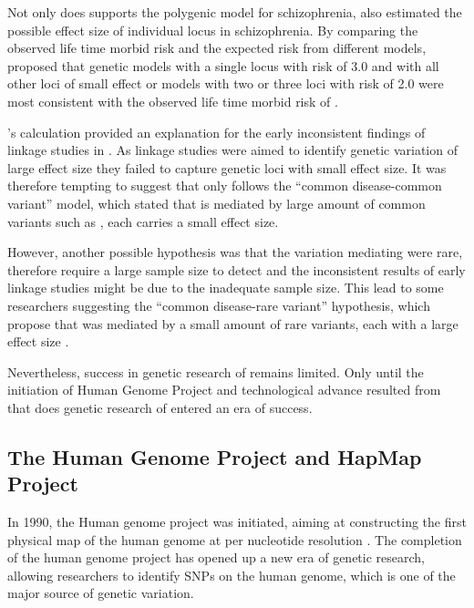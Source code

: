 	Not only does \citet{Risch1990a} supports the polygenic model for schizophrenia, \citet{Risch1990a} also estimated the possible effect size of individual locus in schizophrenia. 
	By comparing the observed life time morbid risk and the expected risk from different models, \citet{Risch1990a} proposed that genetic models with a single locus with risk of 3.0 and with all other loci of small effect or models with two or three loci with risk of 2.0 were most consistent with the observed life time morbid risk of  \citep{Risch1990}.
	
	\citet{Risch1990a}'s calculation provided an explanation for the early inconsistent findings of linkage studies in  \citep{Harrison2005}.
	As linkage studies were aimed to identify genetic variation of large effect size they failed to capture genetic loci with small effect size.
	It was therefore tempting to suggest that  only follows the ``common disease-common variant'' model, which stated that  is mediated by large amount of common variants such as , each carries a small effect size.
	
	However, another possible hypothesis was that the variation mediating  were rare, therefore require a large sample size to detect and the inconsistent results of early linkage studies might be due to the inadequate sample size. 
	This lead to some researchers suggesting the ``common disease-rare variant'' hypothesis, which propose that  was mediated by a small amount of rare variants, each with a large effect size \citep{McClellan2007}.
	
	Nevertheless, success in genetic research of  remains limited.
	Only until the initiation of Human Genome Project and technological advance resulted from that does genetic research of  entered an era of success.
	
	\subsection{The Human Genome Project and HapMap Project}
	In 1990, the Human genome project was initiated, aiming at constructing the first physical map of the human genome at per nucleotide resolution \citep{Lander2001}.
	The completion of the human genome project has opened up a new era of genetic research, allowing researchers to identify \glspl{SNP} on the human genome, which is one of the major source of genetic variation.
	
